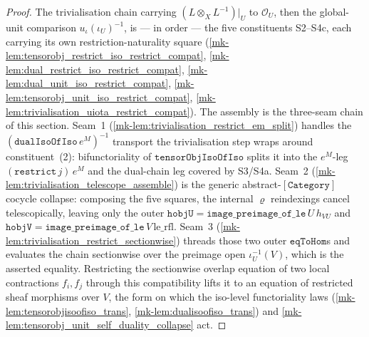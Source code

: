 \begin{proof}
  \leanok
  The trivialisation chain carrying \((L \otimes_X L^{-1})|_U\) to \(\mathcal{O}_U\), then the global-unit
  comparison \(u_\iota(\iota_U)^{-1}\), is --- in order --- the five constituents S2--S4c, each carrying
  its own restriction-naturality square (\ref{mk-lem:tensorobj_restrict_iso_restrict_compat},
  \ref{mk-lem:dual_restrict_iso_restrict_compat}, \ref{mk-lem:dual_unit_iso_restrict_compat},
  \ref{mk-lem:tensorobj_unit_iso_restrict_compat}, \ref{mk-lem:trivialisation_uiota_restrict_compat}). The
  assembly is the three-seam chain of this section. Seam~1
  (\ref{mk-lem:trivialisation_restrict_em_split}) handles the \((\mathtt{dualIsoOfIso}\,e^M)^{-1}\)
  transport the trivialisation step wraps around constituent~(2): bifunctoriality of
  \(\mathtt{tensorObjIsoOfIso}\) splits it into the \(e^M\)-leg \((\mathtt{restrict}\,j)\,e^M\) and the
  dual-chain leg covered by S3/S4a. Seam~2 (\ref{mk-lem:trivialisation_telescope_assemble}) is the generic
  abstract-\([\mathtt{Category}]\) cocycle collapse: composing the five squares, the internal \(\varrho\)
  reindexings cancel telescopically, leaving only the outer
  \(\mathtt{hobjU} = \mathtt{image\_preimage\_of\_le}\,U\,h_{VU}\) and
  \(\mathtt{hobjV} = \mathtt{image\_preimage\_of\_le}\,V\,\mathrm{le\_rfl}\). Seam~3
  (\ref{mk-lem:trivialisation_restrict_sectionwise}) threads those two outer \(\mathtt{eqToHom}\)s and
  evaluates the chain sectionwise over the preimage open \(\iota_U^{-1}(V)\), which is the asserted
  equality. Restricting the sectionwise overlap equation of two local contractions \(f_i, f_j\) through
  this compatibility lifts it to an equation of restricted sheaf morphisms over \(V\), the form on which
  the iso-level functoriality laws (\ref{mk-lem:tensorobjisoofiso_trans}, \ref{mk-lem:dualisoofiso_trans})
  and \ref{mk-lem:tensorobj_unit_self_duality_collapse} act.
\end{proof}

